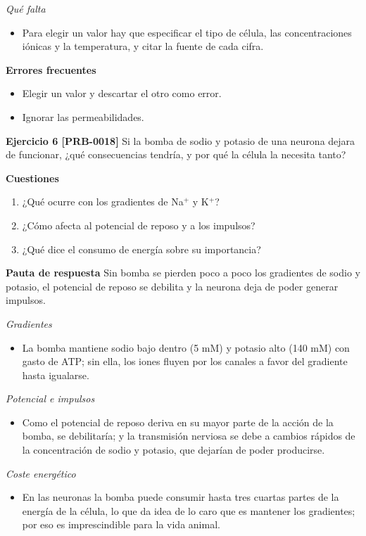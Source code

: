 \documentclass{book}
\begin{document}
\noindent\textit{Qué falta}
\begin{itemize}
\item Para elegir un valor hay que especificar el tipo de célula, las concentraciones iónicas y la temperatura, y citar la fuente de cada cifra.
\end{itemize}

\noindent\textbf{Errores frecuentes}
\begin{itemize}
\item Elegir un valor y descartar el otro como error.
\item Ignorar las permeabilidades.
\end{itemize}

\noindent\textbf{Ejercicio 6 [PRB-0018]}
Si la bomba de sodio y potasio de una neurona dejara de funcionar, ¿qué consecuencias tendría, y por qué la célula la necesita tanto?


\noindent\textbf{Cuestiones}
\begin{enumerate}
\item ¿Qué ocurre con los gradientes de Na\({}^{+}\) y K\({}^{+}\)?
\item ¿Cómo afecta al potencial de reposo y a los impulsos?
\item ¿Qué dice el consumo de energía sobre su importancia?
\end{enumerate}

\noindent\textbf{Pauta de respuesta}
Sin bomba se pierden poco a poco los gradientes de sodio y potasio, el potencial de reposo se debilita y la neurona deja de poder generar impulsos.


\noindent\textit{Gradientes}
\begin{itemize}
\item La bomba mantiene sodio bajo dentro (5 mM) y potasio alto (140 mM) con gasto de ATP; sin ella, los iones fluyen por los canales a favor del gradiente hasta igualarse.
\end{itemize}

\noindent\textit{Potencial e impulsos}
\begin{itemize}
\item Como el potencial de reposo deriva en su mayor parte de la acción de la bomba, se debilitaría; y la transmisión nerviosa se debe a cambios rápidos de la concentración de sodio y potasio, que dejarían de poder producirse.
\end{itemize}

\noindent\textit{Coste energético}
\begin{itemize}
\item En las neuronas la bomba puede consumir hasta tres cuartas partes de la energía de la célula, lo que da idea de lo caro que es mantener los gradientes; por eso es imprescindible para la vida animal.
\end{itemize}
\end{document}
